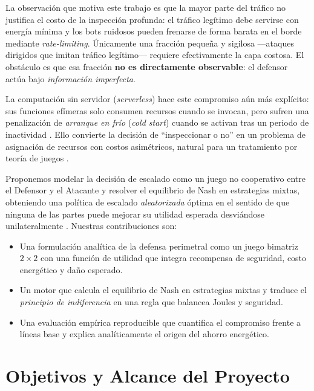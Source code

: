 \documentclass[10pt,twocolumn]{article}
\begin{document}
La observaci\'on que motiva este trabajo es que la mayor parte del tr\'afico no
justifica el costo de la inspecci\'on profunda: el tr\'afico leg\'itimo debe
servirse con energ\'ia m\'inima y los bots ruidosos pueden frenarse de forma barata
en el borde mediante \emph{rate-limiting}. \'Unicamente una fracci\'on peque\~na y
sigilosa ---ataques dirigidos que imitan tr\'afico leg\'itimo--- requiere
efectivamente la capa costosa. El obst\'aculo es que esa fracci\'on \textbf{no es
directamente observable}: el defensor act\'ua bajo \emph{informaci\'on imperfecta}.

La computaci\'on sin servidor (\emph{serverless}) hace este compromiso a\'un m\'as
expl\'icito: sus funciones ef\'imeras solo consumen recursos cuando se invocan, pero
sufren una penalizaci\'on de \emph{arranque en fr\'io} (\emph{cold start}) cuando se
activan tras un periodo de inactividad \cite{castro}. Ello convierte la decisi\'on de
``inspeccionar o no'' en un problema de asignaci\'on de recursos con costos
asim\'etricos, natural para un tratamiento por teor\'ia de juegos \cite{alpcan}.

Proponemos modelar la decisi\'on de escalado como un juego no cooperativo entre el
Defensor y el Atacante y resolver el equilibrio de Nash en estrategias mixtas,
obteniendo una pol\'itica de escalado \emph{aleatorizada} \'optima en el sentido de
que ninguna de las partes puede mejorar su utilidad esperada desvi\'andose
unilateralmente \cite{manshaei}. Nuestras contribuciones son:
\begin{itemize}\itemsep2pt
  \item Una formulaci\'on anal\'itica de la defensa perimetral como un juego bimatriz
        $2\times2$ con una funci\'on de utilidad que integra recompensa de
        seguridad, costo energ\'etico y da\~no esperado.
  \item Un motor que calcula el equilibrio de Nash en estrategias mixtas y traduce el
        \emph{principio de indiferencia} en una regla que balancea Joules y
        seguridad.
  \item Una evaluaci\'on emp\'irica reproducible que cuantifica el compromiso frente
        a l\'ineas base y explica anal\'iticamente el origen del ahorro energ\'etico.
\end{itemize}

\section{Objetivos y Alcance del Proyecto}
\label{sec:objetivos}
\end{document}
